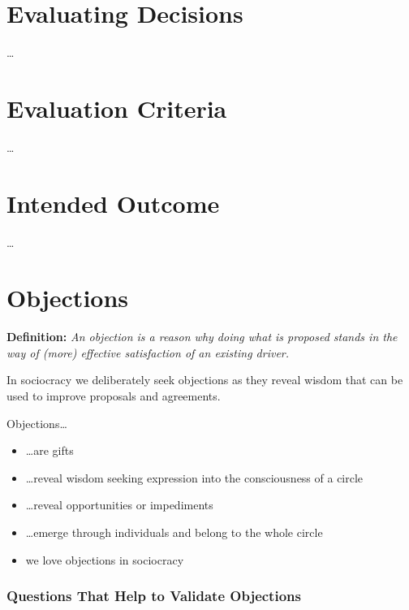 \section{Evaluating Decisions}
\label{evaluatingdecisions}

{\ldots}

\section{Evaluation Criteria}
\label{evaluationcriteria}

{\ldots}

\section{Intended Outcome}
\label{intendedoutcome}

{\ldots}

\section{Objections}
\label{objections}

\textbf{Definition:} \emph{An objection is a reason why doing what is proposed stands in the way of (more) effective satisfaction of an existing driver.}

In sociocracy we deliberately seek objections as they reveal
wisdom that can be used to improve proposals and agreements.

Objections{\ldots}

\begin{itemize}
\item {\ldots}are gifts

\item {\ldots}reveal wisdom seeking expression into the consciousness of a circle

\item {\ldots}reveal opportunities or impediments

\item {\ldots}emerge through individuals and belong to the whole circle

\item we love objections in sociocracy

\end{itemize}

\subsubsection{Questions That Help to Validate Objections}
\label{questionsthathelptovalidateobjections}

